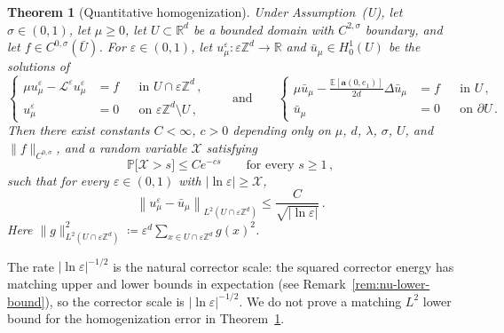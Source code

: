 \documentclass[11pt]{amsart}
\theoremstyle{plain}
\newtheorem{theorem}{Theorem}[section]
\theoremstyle{definition}
\theoremstyle{remark}
\newcommand{\E}{\mathbb{E}}
\newcommand{\Zd}{\mathbb{Z}^d}
\newcommand{\Rd}{\mathbb{R}^d}
\newcommand{\R}{\mathbb{R}}
\renewcommand{\a}{\mathbf{a}}
\newcommand{\eps}{\varepsilon}
\renewcommand{\P}{\mathbb{P}}
\begin{document}
	\begin{theorem}[Quantitative homogenization]
		\label{main.thm}
		Under Assumption~\textup{(U)}, let $\sigma \in (0,1)$, let $\mu \ge 0$, let $U \subset \Rd$ be a bounded domain with $C^{2,\sigma}$ boundary, and let $f \in C^{0,\sigma}(\bar U)$.
		For $\eps \in (0,1)$, let $u^\eps_\mu \colon \eps\Zd \to \R$ and $\bar u_\mu \in H^1_0(U)$ be the solutions of
		\begin{equation}
			\label{e.main.equations}
			\left\{
			\begin{aligned}
				\mu u^\eps_\mu - \mathcal{L}^\eps u^\eps_\mu &= f && \text{in } U \cap \eps\Zd\,, \\
				u^\eps_\mu &= 0 && \text{on } \eps\Zd \setminus U\,,
			\end{aligned}
			\right.
			\qquad \text{and} \qquad
			\left\{
			\begin{aligned}
				\mu \bar u_\mu - \frac{\E[\a(0,e_1)]}{2d} \Delta \bar u_\mu &= f && \text{in } U\,, \\
				\bar u_\mu &= 0 && \text{on } \partial U\,.
			\end{aligned}
			\right.
		\end{equation}
		Then there exist constants $C < \infty$, $c > 0$ depending only on $\mu$, $d$, $\lambda$, $\sigma$, $U$, and $\|f\|_{C^{0,\sigma}}$, and a random variable $\mathcal{X}$ satisfying
		\begin{equation}
			\label{e.minimal.scale}
			\P\bigl[\mathcal{X} > s\bigr] \le C e^{-c s}
			\qquad \text{for every } s \ge 1\,,
		\end{equation}
		such that for every $\eps \in (0,1)$ with $\left| \ln\eps \right| \ge \mathcal{X}$,
		\begin{equation}
			\label{e.quenched.rate}
			\left\| u^\eps_\mu - \bar u_\mu \right\|_{L^2(U \cap \eps\Zd)} \le \frac{C}{\sqrt{\left| \ln\eps \right|}}\,.
		\end{equation}
		Here $\|g\|_{L^2(U \cap \eps\Zd)}^2 \coloneqq \eps^d \sum_{x \in U \cap \eps\Zd} g(x)^2$.
	\end{theorem}
	The rate $\left|\ln\eps \right|^{-1/2}$ is the natural corrector scale: the squared corrector energy has matching upper and lower bounds in expectation (see Remark~\ref{rem:nu-lower-bound}), so the corrector scale is $\left|\ln\eps\right|^{-1/2}$. We do not prove a matching $L^2$ lower bound for the homogenization error in Theorem~\ref{main.thm}.
	
\end{document}
